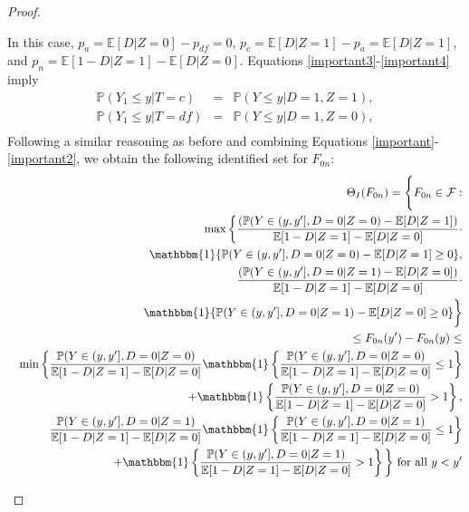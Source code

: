 \documentclass[12pt]{article}
\theoremstyle{plain}
\theoremstyle{definition}
\theoremstyle{remark}
\begin{document}
\begin{proof}
\begin{enumerate}
    In this case, $p_a=\mathbb E[D\vert Z=0]-p_{df}=0$, $p_c=\mathbb E[D\vert Z=1]-p_a=\mathbb E[D\vert Z=1]$, and $p_n=\mathbb E[1-D\vert Z=1]-\mathbb E[D\vert Z=0]$. Equations \eqref{important3}-\eqref{important4} imply
    \begin{eqnarray*}
        \mathbb P(Y_1 \leq y \vert T=c) &=& \mathbb P(Y \leq y \vert D=1, Z=1),\\
        \mathbb P(Y_1 \leq y \vert T=df) &=& \mathbb P(Y \leq y \vert D=1, Z=0),\\
    \end{eqnarray*}
Following a similar reasoning as before and combining Equations \eqref{important}-\eqref{important2}, we obtain the following identified set for $F_{0n}$:
\begin{eqnarray}
    && \Theta_I(F_{0n})=\Bigg\{
    F_{0n} \in \mathcal F: \nonumber\\
    &&\max\bigg\{ \frac{(\mathbb P(Y\in (y,y'], D=0 \vert Z=0)- \mathbb E[D\vert Z=1])}{\mathbb E[1-D\vert Z=1]-\mathbb E[D\vert Z=0]} \cdot\nonumber\\
    && \qquad \mathbbm{1}\{\mathbb P(Y\in (y,y'], D=0 \vert Z=0)- \mathbb E[D\vert Z=1]\geq 0\}, \nonumber \\
   && \qquad \frac{(\mathbb P(Y\in (y,y'], D=0 \vert Z=1)- \mathbb E[D\vert Z=0])}{\mathbb E[1-D\vert Z=1]-\mathbb E[D\vert Z=0]} \cdot \nonumber \\
   && \qquad \mathbbm{1}\{\mathbb P(Y\in (y,y'], D=0 \vert Z=1)- \mathbb E[D\vert Z=0]\geq 0\} \bigg\}\nonumber \\
   && \qquad \leq F_{0n}(y')-F_{0n}(y) \leq \\
   && \min\bigg\{ \frac{\mathbb P(Y\in (y,y'], D=0 \vert Z=0)}{\mathbb E[1-D\vert Z=1]-\mathbb E[D\vert Z=0]}\mathbbm{1}\left\{\frac{\mathbb P(Y\in (y,y'], D=0 \vert Z=0)}{\mathbb E[1-D\vert Z=1]-\mathbb E[D\vert Z=0]} \leq 1\right\}\nonumber \\
   && \qquad \qquad +\mathbbm{1}\left\{\frac{\mathbb P(Y\in (y,y'], D=0 \vert Z=0)}{\mathbb E[1-D\vert Z=1]-\mathbb E[D\vert Z=0]} > 1\right\},\nonumber\\
   && \qquad \frac{\mathbb P(Y\in (y,y'], D=0 \vert Z=1)}{\mathbb E[1-D\vert Z=1]-\mathbb E[D\vert Z=0]}\mathbbm{1}\left\{\frac{\mathbb P(Y\in (y,y'], D=0 \vert Z=1)}{\mathbb E[1-D\vert Z=1]-\mathbb E[D\vert Z=0]} \leq 1\right\}\nonumber \\
   && \qquad \qquad +\mathbbm{1}\left\{\frac{\mathbb P(Y\in (y,y'], D=0 \vert Z=1)}{\mathbb E[1-D\vert Z=1]-\mathbb E[D\vert Z=0]} > 1\right\} \bigg\} \text{ for all } y<y'    

\end{eqnarray}
\end{enumerate}
\end{proof}
\end{document}
